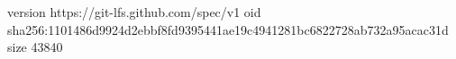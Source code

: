 version https://git-lfs.github.com/spec/v1
oid sha256:1101486d9924d2ebbf8fd9395441ae19c4941281bc6822728ab732a95acac31d
size 43840
